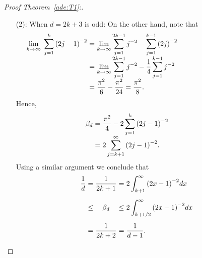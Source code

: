 \begin{proof}[Proof Theorem~\ref{ade:T1}:]
\begin{enumerate}
    \item[(2):] When $d = 2k+3$ is odd:
    On the other hand, note that
    \[\hspace{-35mm}\everymath{\displaystyle}\arraycolsep=1.5pt\def\arraystretch{1.5}
      \begin{array}{rcl}
      \lim_{k\to\infty} \; \sum_{j = 1}^{k} {(2j-1)}^{-2} 
      & = & \lim_{k\to\infty} \sum_{j = 1}^{2k-1} j^{-2} - \sum_{j = 1}^{k-1} {(2j)}^{-2}\\
      & = & \lim_{k\to\infty} \sum_{j = 1}^{2k-1} j^{-2} - \frac{1}{4}\sum_{j = 1}^{k-1} j^{-2}\\
      & = & \frac{\pi^2}{6}-\frac{\pi^2}{24} = \frac{\pi^2}{8}.
    \end{array}\]
    Hence,
    \[\hspace{-10mm}\everymath{\displaystyle}\arraycolsep=1.5pt\def\arraystretch{1.5}
    \begin{array}{rll}
      \beta_d & = & \frac{\pi^2}{4} - 2 \sum_{j = 1}^{k} {\left(2j-1\right)}^{-2}\\
      & = & 2\sum_{j = k+1}^{\infty}{\left(2j-1\right)}^{-2}.\\
    \end{array}      
   \]
   Using a similar argument we conclude that
   \[\everymath{\displaystyle}\arraycolsep=1.5pt\def\arraystretch{1.5}
      \begin{array}{rrcrl}
        \frac{1}{d} & = & \frac{1}{2k+1}  & = & 2 \int_{k+1}^{\infty}{(2x-1)}^{-2} dx\\[5mm]
      & \leq & \beta_d    & \leq & 2 \int_{k+1/2}^{\infty}{(2x-1)}^{-2} dx\\[5mm]
      &  = & \frac{1}{2k+2} & = & \frac{1}{d-1}.
    \end{array}  \] 
  \end{enumerate}
\end{proof}

